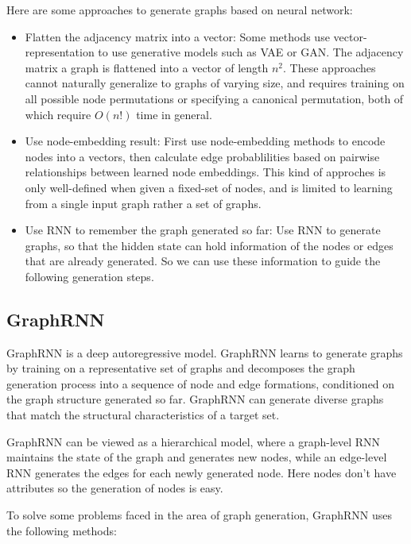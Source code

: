 \begin{survey}
Here are some approaches to generate graphs based on neural network:

\begin{itemize}
\item
  Flatten the adjacency matrix into a vector: Some methods use
  vector-representation to use generative models such as VAE or GAN. The
  adjacency matrix a graph is flattened into a vector of length \(n^2\).
  These approaches cannot naturally generalize to graphs of varying
  size, and requires training on all possible node permutations or
  specifying a canonical permutation, both of which require \(O(n!)\)
  time in general.
\item
  Use node-embedding result: First use node-embedding methods
  to encode nodes into a vectors, then calculate edge probablilities
  based on pairwise relationships between learned node embeddings. This
  kind of approches is only well-defined when given a fixed-set of
  nodes, and is limited to learning from a single input graph rather a
  set of graphs.
\item
  Use RNN to remember the graph generated so far: Use RNN to
  generate graphs, so that the hidden state can hold information of the
  nodes or edges that are already generated. So we can use these
  information to guide the following generation steps.
\end{itemize}

\vspace{0.2cm}

\subsection{GraphRNN\cite{You2018GraphRNN}}

GraphRNN is a deep autoregressive model. GraphRNN learns to generate
graphs by training on a representative set of graphs and decomposes the
graph generation process into a sequence of node and edge formations,
conditioned on the graph structure generated so far. GraphRNN can
generate diverse graphs that match the structural characteristics of a
target set.

GraphRNN can be viewed as a hierarchical model, where a graph-level RNN
maintains the state of the graph and generates new nodes, while an
edge-level RNN generates the edges for each newly generated node. Here
nodes don't have attributes so the generation of nodes is easy.

To solve some problems faced in the area of graph generation, GraphRNN
uses the following methods:


\end{survey}
